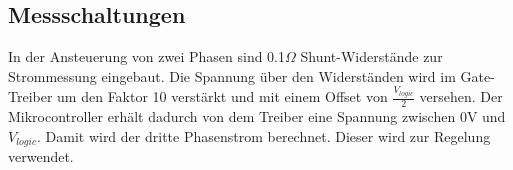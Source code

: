 \subsection*{Messschaltungen}
In der Ansteuerung von zwei Phasen sind 0.1\(\Omega\) Shunt-Widerstände zur Strommessung eingebaut. Die Spannung über den Widerständen wird im Gate-Treiber um den Faktor 10 verstärkt und mit einem Offset von $\frac{V_{logic}}{2}$ versehen. Der Mikrocontroller erhält dadurch von dem Treiber eine Spannung zwischen 0V und $V_{logic}$. Damit wird der dritte Phasenstrom berechnet. Dieser wird zur Regelung verwendet.
